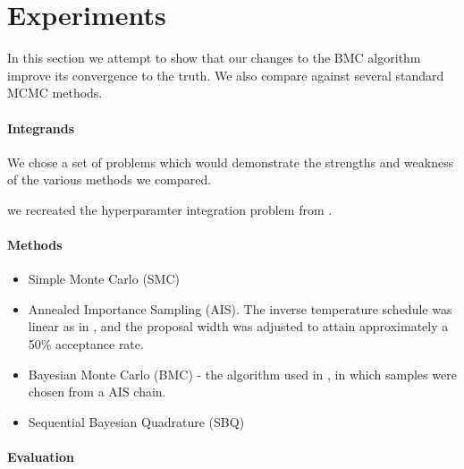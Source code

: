 \documentclass{article}
\begin{document}
\section{Experiments}

In this section we attempt to show that our changes to the BMC algorithm improve its convergence to the truth.  We also compare against several standard MCMC methods.

\paragraph{Integrands}

We chose a set of problems which would demonstrate the strengths and weakness of the various methods we compared.

we recreated the hyperparamter integration problem from \citep{BZMonteCarlo}.



\paragraph{Methods}

\begin{itemize}
\item Simple Monte Carlo (SMC)
\item Annealed Importance Sampling (AIS).  The inverse temperature schedule was linear as in \citep{BZMonteCarlo}, and the proposal width was adjusted to attain approximately a 50\% acceptance rate.
\item Bayesian Monte Carlo (BMC) - the algorithm used in \citep{BZMonteCarlo}, in which samples were chosen from a AIS chain.
\item Sequential Bayesian Quadrature (SBQ)
\end{itemize}

\paragraph{Evaluation}
\end{document}

